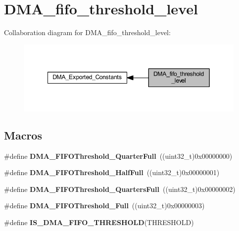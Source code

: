 \hypertarget{group___d_m_a__fifo__threshold__level}{}\section{D\+M\+A\+\_\+fifo\+\_\+threshold\+\_\+level}
\label{group___d_m_a__fifo__threshold__level}
Collaboration diagram for D\+M\+A\+\_\+fifo\+\_\+threshold\+\_\+level\+:
\nopagebreak
\begin{figure}[H]
\begin{center}
\leavevmode
\includegraphics[width=349pt]{group___d_m_a__fifo__threshold__level}
\end{center}
\end{figure}
\subsection*{Macros}
\begin{DoxyCompactItemize}
\item 
\mbox{\label{group___d_m_a__fifo__threshold__level_gacc98384bbba43a9c4f70b448518acfe4}} 
\#define {\bfseries D\+M\+A\+\_\+\+F\+I\+F\+O\+Threshold\+\_\+Quarter\+Full}~((uint32\+\_\+t)0x00000000)
\item 
\mbox{\label{group___d_m_a__fifo__threshold__level_ga626b546865960343fdcfdf33ac8ceb03}} 
\#define {\bfseries D\+M\+A\+\_\+\+F\+I\+F\+O\+Threshold\+\_\+\+Half\+Full}~((uint32\+\_\+t)0x00000001)
\item 
\mbox{\label{group___d_m_a__fifo__threshold__level_ga6f041008fce4bb341f9a518d803a308b}} 
\#define {\bfseries D\+M\+A\+\_\+\+F\+I\+F\+O\+Threshold\+\_\+Quarters\+Full}~((uint32\+\_\+t)0x00000002)
\item 
\mbox{\label{group___d_m_a__fifo__threshold__level_ga9f1008e0df7d41d910ed89d7e0872e69}} 
\#define {\bfseries D\+M\+A\+\_\+\+F\+I\+F\+O\+Threshold\+\_\+\+Full}~((uint32\+\_\+t)0x00000003)
\item 
\#define {\bfseries I\+S\+\_\+\+D\+M\+A\+\_\+\+F\+I\+F\+O\+\_\+\+T\+H\+R\+E\+S\+H\+O\+LD}(T\+H\+R\+E\+S\+H\+O\+LD)
\end{DoxyCompactItemize}


